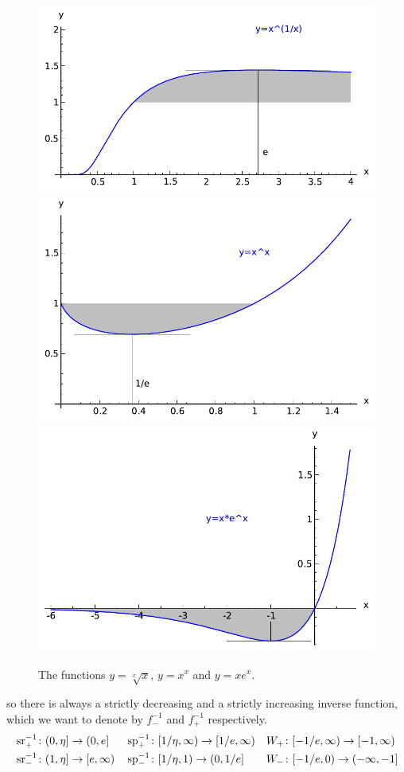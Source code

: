 \documentclass{article}
\numberwithin{equation}{section}
\begin{document}
\begin{figure}
  \centering
  \includegraphics[scale=0.8]{realfp/sr}
  \includegraphics[scale=0.8]{realfp/sp}
  \includegraphics[scale=0.8]{realfp/me}
  \caption{The functions $y=\sqrt[x]{x}$, $y=x^x$ and $y=x e^x$.}
  \label{fig:3plots}
\end{figure}
so there is always a strictly decreasing and a strictly
increasing inverse function, which we want to denote by $f^{-1}_-$ and
$f^{-1}_+$ respectively. 
\begin{align*}
  &\operatorname{sr}^{-1}_+\colon (0,\eta]\to (0,e]&
  &\operatorname{sp}^{-1}_+\colon [1/\eta,\infty)\to [1/e,\infty)&
  &W_+\colon [-1/e,\infty)\to[-1,\infty)\\
  &\operatorname{sr}^{-1}_-\colon (1,\eta]\to [e,\infty)&
  &\operatorname{sp}^{-1}_-\colon [1/\eta,1)\to (0,1/e]&
  &W_{-}\colon [-1/e,0)\to (-\infty,-1]
\end{align*}
\end{document}
